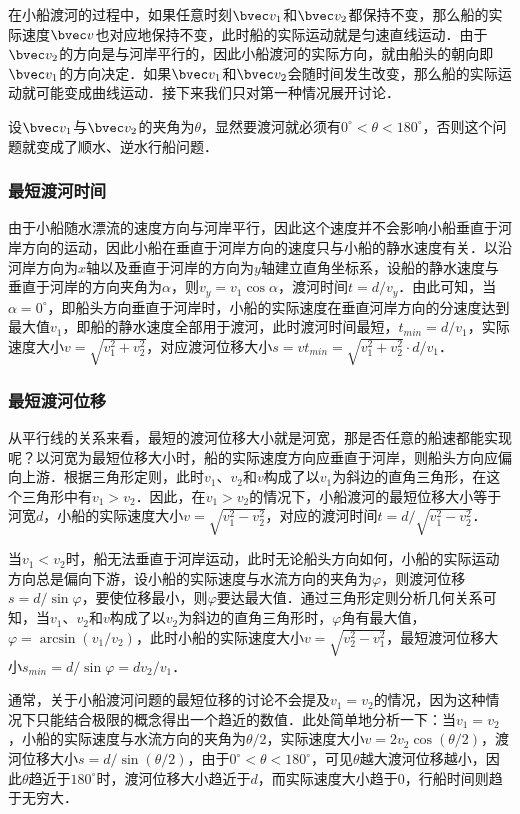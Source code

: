 在小船渡河的过程中，如果任意时刻$\bvec v_1$和$\bvec v_2$都保持不变，那么船的实际速度$\bvec v$也对应地保持不变，此时船的实际运动就是匀速直线运动．由于$\bvec v_2$的方向是与河岸平行的，因此小船渡河的实际方向，就由船头的朝向即$\bvec v_1$的方向决定．如果$\bvec v_1$和$\bvec v_2$会随时间发生改变，那么船的实际运动就可能变成曲线运动．接下来我们只对第一种情况展开讨论．

设$\bvec v_1$与$\bvec v_2$的夹角为$\theta$，显然要渡河就必须有$0^\circ < \theta < 180^\circ $，否则这个问题就变成了顺水、逆水行船问题．

\subsubsection{最短渡河时间}

由于小船随水漂流的速度方向与河岸平行，因此这个速度并不会影响小船垂直于河岸方向的运动，因此小船在垂直于河岸方向的速度只与小船的静水速度有关．以沿河岸方向为$x$轴以及垂直于河岸的方向为$y$轴建立直角坐标系，设船的静水速度与垂直于河岸的方向夹角为$\alpha$，则$v_y = v_1 \cos \alpha$，渡河时间$t=d/v_y$．由此可知，当$\alpha = 0^\circ$，即船头方向垂直于河岸时，小船的实际速度在垂直河岸方向的分速度达到最大值$v_1$，即船的静水速度全部用于渡河，此时渡河时间最短，$t_{min}=d/v_1$，实际速度大小$v=\sqrt{v_1^2+v_2^2}$，对应渡河位移大小$s=vt_{min}=\sqrt{v_1^2+v_2^2}\cdot d/v_1$．

\subsubsection{最短渡河位移}

从平行线的关系来看，最短的渡河位移大小就是河宽，那是否任意的船速都能实现呢？以河宽为最短位移大小时，船的实际速度方向应垂直于河岸，则船头方向应偏向上游．根据三角形定则，此时$v_1$、$v_2$和$v$构成了以$v_1$为斜边的直角三角形，在这个三角形中有$v_1>v_2$．因此，在$v_1>v_2$的情况下，小船渡河的最短位移大小等于河宽$d$，小船的实际速度大小$v=\sqrt{v_1^2-v_2^2}$，对应的渡河时间$t=d/\sqrt{v_1^2-v_2^2}$．

当$v_1<v_2$时，船无法垂直于河岸运动，此时无论船头方向如何，小船的实际运动方向总是偏向下游，设小船的实际速度与水流方向的夹角为$\varphi$，则渡河位移$s = d/\sin \varphi$，要使位移最小，则$\varphi$要达最大值．通过三角形定则分析几何关系可知，当$v_1$、$v_2$和$v$构成了以$v_2$为斜边的直角三角形时，$\varphi$角有最大值，$\varphi=\arcsin(v_1/v_2)$，此时小船的实际速度大小$v=\sqrt{v_2^2-v_1^2}$，最短渡河位移大小$s_{min} = d/\sin \varphi=dv_2/v_1$．

通常，关于小船渡河问题的最短位移的讨论不会提及$v_1=v_2$的情况，因为这种情况下只能结合极限的概念得出一个趋近的数值．此处简单地分析一下：当$v_1=v_2$，小船的实际速度与水流方向的夹角为$\theta /2$，实际速度大小$v=2v_2\cos(\theta /2)$，渡河位移大小$s= d/\sin(\theta/2)$，由于$0^\circ < \theta < 180^\circ $，可见$\theta$越大渡河位移越小，因此$\theta$趋近于$180^\circ $时，渡河位移大小趋近于$d$，而实际速度大小趋于$0$，行船时间则趋于无穷大．

